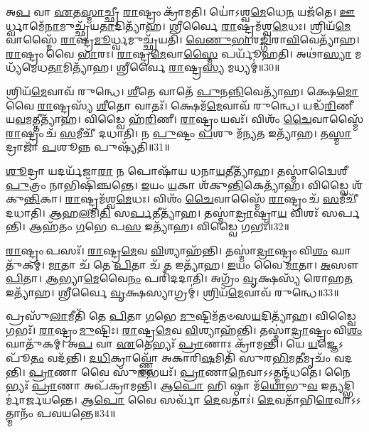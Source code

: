 𑌅\-\ul{𑌪} 𑌵𑌾 \ul{𑌏}\-𑌤\-\ul{𑌸𑍍𑌮𑌾}\-𑌚𑍍𑌛𑍍𑌰𑍀 \ul{𑌰𑌾}\-𑌷𑍍𑌟𑍍𑌰𑌂 𑌕𑍍𑌰𑌾᳴𑌮𑌤𑌿।
𑌯𑍋॑𑌽𑌶𑍍𑌵\-\ul{𑌮𑍇}\-𑌧𑍇\-\ul{𑌨} 𑌯𑌜᳴𑌤𑍇।
\-\ul{𑌊}\-𑌰𑍍𑌧𑍍𑌵𑌾𑌮𑍇᳴\-\ul{𑌨𑌾}\-𑌮𑍁𑌚𑍍𑌛𑍍𑌰᳴𑌯\-\ul{𑌤𑌾}\-𑌦𑌿𑌤𑍍𑌯𑌾᳴𑌹।
𑌶𑍍𑌰𑍀𑌰𑍍𑌵𑍈 \ul{𑌰𑌾}\-𑌷𑍍𑌟𑍍𑌰𑌮᳴𑌶𑍍𑌵\-\ul{𑌮𑍇}\-𑌧𑌃।
𑌶𑍍𑌰𑌿𑌯᳴\-\ul{𑌮𑍇}\-𑌵𑌾𑌸𑍍𑌮𑍈᳴ \ul{𑌰𑌾}\-𑌷𑍍𑌟𑍍𑌰\-\ul{𑌮𑍂}\-𑌰𑍍𑌧𑍍𑌵𑌮𑍁𑌚𑍍𑌛𑍍𑌰᳴𑌯𑌤𑌿।
\-\ul{𑌵𑍇}\-\-\ul{𑌣𑍁}\-\-\ul{𑌭𑌾}\-𑌰\-\ul{𑌙𑍍𑌗𑌿}\-𑌰𑌾\-\ul{𑌵𑌿}\-𑌵𑍇𑌤𑍍𑌯𑌾᳴𑌹।
\-\ul{𑌰𑌾}\-𑌷𑍍𑌟𑍍𑌰𑌂 𑌵𑍈 \ul{𑌭𑌾}\-𑌰𑌃।
\-\ul{𑌰𑌾}\-𑌷𑍍𑌟𑍍𑌰\-\ul{𑌮𑍇}\-𑌵𑌾\-\ul{𑌸𑍍𑌮𑍈} 𑌪𑌰𑍍𑌯𑍂᳴𑌹𑌤𑌿।
𑌅𑌥𑌾॑\-\ul{𑌸𑍍𑌯𑌾} 𑌮𑌧𑍍𑌯᳴𑌮𑍇𑌧\-\ul{𑌤𑌾}\-𑌮𑌿𑌤𑍍𑌯𑌾᳴𑌹।
𑌶𑍍𑌰𑍀𑌰𑍍𑌵𑍈 \ul{𑌰𑌾}\-𑌷𑍍𑌟𑍍𑌰\-\ul{𑌸𑍍𑌯} 𑌮𑌧𑍍𑌯𑌮𑍍॑॥30॥

𑌶𑍍𑌰𑌿𑌯᳴\-\ul{𑌮𑍇}\-𑌵𑌾𑌵᳴ 𑌰𑍁𑌨𑍍𑌧𑍇।
\-\ul{𑌶𑍀}\-𑌤𑍇 𑌵𑌾𑌤𑍇᳴ \ul{𑌪𑍁}\-𑌨\-\ul{𑌨𑍍𑌨𑌿}\-𑌵𑍇𑌤𑍍𑌯𑌾᳴𑌹।
𑌕𑍍𑌷𑍇\-\ul{𑌮𑍋} 𑌵𑍈 \ul{𑌰𑌾}\-𑌷𑍍𑌟𑍍𑌰𑌸𑍍𑌯᳴ \ul{𑌶𑍀}\-𑌤𑍋 𑌵𑌾𑌤𑌃᳴।
𑌕𑍍𑌷𑍇𑌮᳴\-\ul{𑌮𑍇}\-𑌵𑌾𑌵᳴ 𑌰𑍁𑌨𑍍𑌧𑍇।
𑌯𑌦𑍍𑌧᳴\-\ul{𑌰𑌿}\-𑌣𑍀 𑌯\-\ul{𑌵}\-𑌮𑌤𑍍𑌤𑍀𑌤𑍍𑌯𑌾᳴𑌹।
𑌵𑌿𑌡𑍍𑌵𑍈 𑌹᳴\-\ul{𑌰𑌿}\-𑌣𑍀।
\-\ul{𑌰𑌾}\-𑌷𑍍𑌟𑍍𑌰𑌂 𑌯𑌵𑌃᳴।
𑌵𑌿𑌶𑌂᳴ \ul{𑌚𑍈}\-𑌵𑌾𑌸𑍍𑌮𑍈᳴ \ul{𑌰𑌾}\-𑌷𑍍𑌟𑍍𑌰𑌂 𑌚᳴ \ul{𑌸}\-𑌮𑍀𑌚𑍀᳴ 𑌦𑌧𑌾𑌤𑌿।
𑌨 \ul{𑌪𑍁}\-𑌷𑍍𑌟𑌂 \ul{𑌪}\-𑌶𑍁 𑌮᳴𑌨𑍍𑌯\-\ul{𑌤} 𑌇𑌤𑍍𑌯𑌾᳴𑌹।
𑌤\-\ul{𑌸𑍍𑌮𑌾}\-𑌦𑍍𑌰𑌾𑌜𑌾᳴ \ul{𑌪}\-𑌶𑍂𑌨𑍍𑌨 𑌪𑍁𑌷𑍍𑌯᳴𑌤𑌿॥31॥

\-\ul{𑌶𑍂}\-𑌦𑍍𑌰𑌾 𑌯𑌦𑌰𑍍𑌯᳴𑌜𑌾\-\ul{𑌰𑌾} 𑌨 𑌪𑍋𑌷𑌾᳴𑌯 𑌧𑌨𑌾\-\ul{𑌯}\-𑌤𑍀𑌤𑍍𑌯𑌾᳴𑌹।
𑌤𑌸𑍍𑌮𑌾॑𑌦𑍍𑌵𑍈𑌶𑍀\-\ul{𑌪𑍁}\-𑌤𑍍𑌰𑌂 𑌨𑌾𑌭𑌿𑌷𑌿᳴𑌞𑍍𑌚𑌨𑍍𑌤𑍇।
\-\ul{𑌇}\-𑌯𑌂 \ul{𑌯}\-𑌕𑌾 𑌶᳴𑌕𑍁\-\ul{𑌨𑍍𑌤𑌿}\-𑌕𑍇𑌤𑍍𑌯𑌾᳴𑌹।
𑌵𑌿𑌡𑍍𑌵𑍈 𑌶᳴𑌕𑍁\-\ul{𑌨𑍍𑌤𑌿}\-𑌕𑌾।
\-\ul{𑌰𑌾}\-𑌷𑍍𑌟𑍍𑌰𑌮᳴𑌶𑍍𑌵\-\ul{𑌮𑍇}\-𑌧𑌃।
𑌵𑌿𑌶𑌂᳴ \ul{𑌚𑍈}\-𑌵𑌾𑌸𑍍𑌮𑍈᳴ \ul{𑌰𑌾}\-𑌷𑍍𑌟𑍍𑌰𑌂 𑌚᳴ \ul{𑌸}\-𑌮𑍀𑌚𑍀᳴ 𑌦𑌧𑌾𑌤𑌿।
\-\ul{𑌆}\-𑌹\-\ul{𑌲}\-𑌮𑌿\-\ul{𑌤𑌿} 𑌸\-\ul{𑌰𑍍𑌪}\-𑌤𑍀𑌤𑍍𑌯𑌾᳴𑌹।
𑌤𑌸𑍍𑌮𑌾॑\-\ul{𑌦𑍍𑌰𑌾}\-𑌷𑍍𑌟𑍍𑌰𑌾\-\ul{𑌯} 𑌵𑌿𑌶𑌃᳴ 𑌸𑌰𑍍𑌪𑌨𑍍𑌤𑌿।
𑌆𑌹᳴𑌤𑌂 \ul{𑌗}\-𑌭𑍇 𑌪\-\ul{𑌸} 𑌇𑌤𑍍𑌯𑌾᳴𑌹।
𑌵𑌿𑌡𑍍𑌵𑍈 𑌗𑌭𑌃᳴॥32॥

\-\ul{𑌰𑌾}\-𑌷𑍍𑌟𑍍𑌰𑌂 𑌪𑌸𑌃᳴।
\-\ul{𑌰𑌾}\-𑌷𑍍𑌟𑍍𑌰\-\ul{𑌮𑍇}\-𑌵 \ul{𑌵𑌿}\-𑌶𑍍𑌯𑌾𑌹᳴𑌨𑍍𑌤𑌿।
𑌤𑌸𑍍𑌮𑌾॑\-\ul{𑌦𑍍𑌰𑌾}\-𑌷𑍍𑌟𑍍𑌰𑌂 𑌵𑌿\-\ul{𑌶𑌂} 𑌘𑌾𑌤𑍁᳴𑌕𑌮𑍍।
\-\ul{𑌮𑌾}\-𑌤𑌾 𑌚᳴ 𑌤𑍇 \ul{𑌪𑌿}\-𑌤𑌾 𑌚᳴ \ul{𑌤} 𑌇𑌤𑍍𑌯𑌾᳴𑌹।
\-\ul{𑌇}\-𑌯𑌂 𑌵𑍈 \ul{𑌮𑌾}\-𑌤𑌾।
\-\ul{𑌅}\-𑌸𑍗 \ul{𑌪𑌿}\-𑌤𑌾।
\-\ul{𑌆}\-𑌭𑍍𑌯𑌾\-\ul{𑌮𑍇}\-𑌵𑍈\-\ul{𑌨𑌂} 𑌪𑌰𑌿᳴𑌦𑌦𑌾𑌤𑌿।
𑌅𑌗𑍍𑌰𑌂᳴ \ul{𑌵𑍃}\-𑌕𑍍𑌷𑌸𑍍𑌯᳴ 𑌰𑍋𑌹\-\ul{𑌤} 𑌇𑌤𑍍𑌯𑌾᳴𑌹।
𑌶𑍍𑌰𑍀𑌰𑍍𑌵𑍈 \ul{𑌵𑍃}\-𑌕𑍍𑌷𑌸𑍍𑌯𑌾𑌗𑍍𑌰𑌮𑍍॑।
\-\ul{𑌶𑍍𑌰𑌿}\-𑌯᳴\-\ul{𑌮𑍇}\-𑌵𑌾𑌵᳴ 𑌰𑍁𑌨𑍍𑌧𑍇॥33॥

𑌪𑍍𑌰𑌸𑍁᳴\-\ul{𑌲𑌾}\-𑌮𑍀𑌤𑌿᳴ 𑌤𑍇 \ul{𑌪𑌿}\-𑌤𑌾 \ul{𑌗}\-𑌭𑍇 \ul{𑌮𑍁}\-𑌷𑍍𑌟𑌿𑌮᳴𑌤𑍞𑌸\-\ul{𑌯}\-𑌦𑌿𑌤𑍍𑌯𑌾᳴𑌹।
𑌵𑌿𑌡𑍍𑌵𑍈 𑌗𑌭𑌃᳴।
\-\ul{𑌰𑌾}\-𑌷𑍍𑌟𑍍𑌰𑌂 \ul{𑌮𑍁}\-𑌷𑍍𑌟𑌿𑌃।
\-\ul{𑌰𑌾}\-𑌷𑍍𑌟𑍍𑌰\-\ul{𑌮𑍇}\-𑌵 \ul{𑌵𑌿}\-𑌶𑍍𑌯𑌾𑌹᳴𑌨𑍍𑌤𑌿।
𑌤𑌸𑍍𑌮𑌾॑\-\ul{𑌦𑍍𑌰𑌾}\-𑌷𑍍𑌟𑍍𑌰𑌂 𑌵𑌿\-\ul{𑌶𑌂} 𑌘𑌾𑌤𑍁᳴𑌕𑌮𑍍।
𑌅\-\ul{𑌪} 𑌵𑌾 \ul{𑌏}\-𑌤𑍇𑌭𑍍𑌯𑌃᳴ \ul{𑌪𑍍𑌰𑌾}\-𑌣𑌾𑌃 𑌕𑍍𑌰𑌾᳴𑌮𑌨𑍍𑌤𑌿।
𑌯𑍇 \ul{𑌯}\-𑌜𑍍𑌞𑍇\-𑌽𑌪𑍂᳴\-\ul{𑌤𑌂} 𑌵𑌦᳴𑌨𑍍𑌤𑌿।
\-\ul{𑌦}\-\-\ul{𑌧𑌿}\-𑌕𑍍𑌰𑌾𑌵𑍍𑌣𑍍𑌣𑍋᳴ 𑌅𑌕𑌾𑌰𑌿\-\ul{𑌷}\-𑌮𑌿𑌤𑌿᳴ 𑌸𑍁𑌰\-\ul{𑌭𑌿}\-𑌮\-\ul{𑌤𑍀}\-𑌮𑍃𑌚𑌂᳴ 𑌵𑌦𑌨𑍍𑌤𑌿।
\-\ul{𑌪𑍍𑌰𑌾}\-𑌣𑌾 𑌵𑍈 𑌸𑍁᳴\-\ul{𑌰}\-𑌭𑌯𑌃᳴।
\-\ul{𑌪𑍍𑌰𑌾}\-𑌣𑌾\-\ul{𑌨𑍇}\-𑌵𑌾𑌽𑌽𑌤𑍍𑌮𑌨𑍍𑌦᳴𑌧𑌤𑍇।
𑌨𑍈𑌭𑍍𑌯𑌃᳴ \ul{𑌪𑍍𑌰𑌾}\-𑌣𑌾 𑌅𑌪᳴𑌕𑍍𑌰𑌾𑌮𑌨𑍍𑌤𑌿।
𑌆\-\ul{𑌪𑍋} 𑌹𑌿 𑌷𑍍𑌠𑌾 𑌮᳴\-\ul{𑌯𑍋}\-𑌭𑍁\-\ul{𑌵} 𑌇\-\ul{𑌤𑍍𑌯}\-𑌦𑍍𑌭𑌿𑌰𑍍𑌮𑌾॑𑌰𑍍𑌜𑌯𑌨𑍍𑌤𑍇।
𑌆\-\ul{𑌪𑍋} 𑌵𑍈 𑌸𑌰𑍍𑌵𑌾᳴ \ul{𑌦𑍇}\-𑌵𑌤𑌾𑌃॑।
\-\ul{𑌦𑍇}\-𑌵𑌤𑌾᳴𑌭𑌿\-\ul{𑌰𑍇}\-𑌵𑌾𑌽𑌽𑌤𑍍𑌮𑌾𑌨𑌂᳴ 𑌪𑌵𑌯𑌨𑍍𑌤𑍇॥34॥\anuvakamend[\-\ul{𑌰𑌾}\-𑌷𑍍𑌟𑍍𑌰\-\ul{𑌸𑍍𑌯} 𑌮\-\ul{𑌧𑍍𑌯𑌂} 𑌪𑍁𑌷𑍍𑌯᳴\-\ul{𑌤𑌿} 𑌗𑌭𑍋᳴ 𑌰𑍁𑌨𑍍𑌧𑍇 𑌦𑌧𑌤𑍇 \ul{𑌚}\-𑌤𑍍𑌵𑌾𑌰𑌿᳴ 𑌚]

